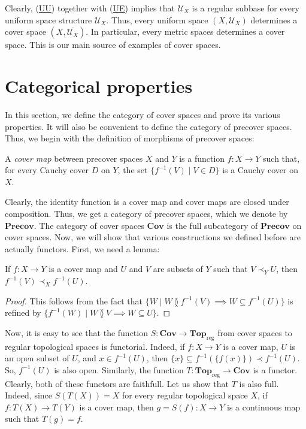 \documentclass[reqno]{amsart}
\newcommand{\axref}[1]{(\hyperref[ax:#1]{#1})}
\theoremstyle{definition}
\theoremstyle{remark}
\numberwithin{figure}{section}
\newcommand{\overlap}[2]{#1 \between #2}
\newcommand{\rb}{\prec}
\newcommand{\cat}[1]{\mathbf{#1}}
\begin{document}
Clearly, \axref{UU} together with \axref{UE} implies that $\mathcal{U}_X$ is a regular subbase for every uniform space structure $\mathcal{U}_X$.
Thus, every uniform space $(X,\mathcal{U}_X)$ determines a cover space $(X,\overline{\mathcal{U}_X})$.
In particular, every metric spaces determines a cover space.
This is our main source of examples of cover spaces.

\section{Categorical properties}
\label{sec:cat}

In this section, we define the category of cover spaces and prove its various properties.
It will also be convenient to define the category of precover spaces.
Thus, we begin with the definition of morphisms of precover spaces:

\begin{defn}
A \emph{cover map} between precover spaces $X$ and $Y$ is a function $f : X \to Y$ such that, for every Cauchy cover $D$ on $Y$, the set $\{ f^{-1}(V) \mid V \in D \}$ is a Cauchy cover on $X$.
\end{defn}

Clearly, the identity function is a cover map and cover maps are closed under composition.
Thus, we get a category of precover spaces, which we denote by $\cat{Precov}$.
The category of cover spaces $\cat{Cov}$ is the full subcategory of $\cat{Precov}$ on cover spaces.
Now, we will show that various constructions we defined before are actually functors.
First, we need a lemma:

\begin{lem}
If $f : X \to Y$ is a cover map and $U$ and $V$ are subsets of $Y$ such that $V \rb_Y U$, then $f^{-1}(V) \rb_X f^{-1}(U)$.
\end{lem}
\begin{proof}
This follows from the fact that $\{ W \mid \overlap{W}{f^{-1}(V)} \implies W \subseteq f^{-1}(U) \}$ is refined by $\{ f^{-1}(W) \mid \overlap{W}{V} \implies W \subseteq U \}$.
\end{proof}

Now, it is easy to see that the function $S : \cat{Cov} \to \cat{Top}_\mathrm{reg}$ from cover spaces to regular topological spaces is functorial.
Indeed, if $f : X \to Y$ is a cover map, $U$ is an open subset of $U$, and $x \in f^{-1}(U)$, then $\{ x \} \subseteq f^{-1}(\{ f(x) \}) \rb f^{-1}(U)$.
So, $f^{-1}(U)$ is also open.
Similarly, the function $T : \cat{Top}_\mathrm{reg} \to \cat{Cov}$ is a functor.
Clearly, both of these functors are faithfull.
Let us show that $T$ is also full.
Indeed, since $S(T(X)) = X$ for every regular topological space $X$, if $f : T(X) \to T(Y)$ is a cover map, then $g = S(f) : X \to Y$ is a continuous map such that $T(g) = f$.
\end{document}
